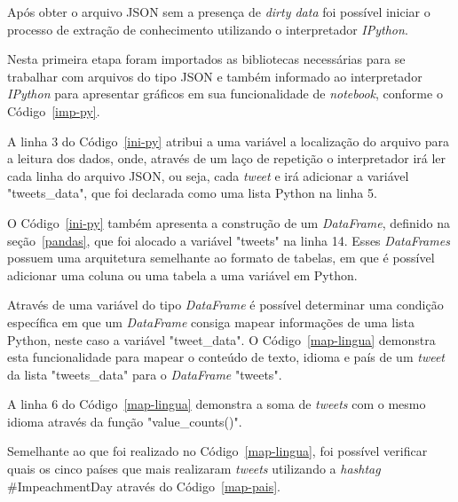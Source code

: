 Após obter o arquivo JSON sem a presença de \textit{dirty data} foi possível iniciar o processo de extração de conhecimento utilizando o interpretador \textit{IPython}.

Nesta primeira etapa foram importados as bibliotecas necessárias para se trabalhar com arquivos do tipo JSON e também informado ao interpretador \textit{IPython} para apresentar gráficos em sua funcionalidade de \textit{notebook}, conforme o Código~\ref{imp-py}.



A linha 3 do Código~\ref{ini-py} atribui a uma variável a localização do arquivo para a leitura dos dados, onde, através de um laço de repetição o interpretador irá ler cada linha do arquivo JSON, ou seja, cada \textit{tweet} e irá adicionar a variável "tweets\_data", que foi declarada como uma lista Python na linha 5.



O Código~\ref{ini-py} também apresenta a construção de um \textit{DataFrame}, definido na seção~\ref{pandas}, que foi alocado a variável "tweets" \space na linha 14. Esses \textit{DataFrames} possuem uma arquitetura semelhante ao formato de tabelas, em que é possível adicionar uma coluna ou uma tabela a uma variável em Python.

Através de uma variável do tipo \textit{DataFrame} é possível determinar uma condição específica em que um \textit{DataFrame} consiga mapear informações de uma lista Python, neste caso a variável "tweet\_data". O Código~\ref{map-lingua} demonstra esta funcionalidade para mapear o conteúdo de texto, idioma e país de um \textit{tweet} da lista "tweets\_data" \space para o \textit{DataFrame} "tweets".



A linha 6 do Código~\ref{map-lingua} demonstra a soma de \textit{tweets} com o mesmo idioma através da função "value\_counts()".

Semelhante ao que foi realizado no Código~\ref{map-lingua}, foi possível verificar quais os cinco países que mais realizaram \textit{tweets} utilizando a \textit{hashtag} \#ImpeachmentDay através do Código~\ref{map-pais}.



